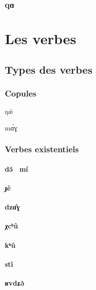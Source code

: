 \documentclass[11pt, a4paper]{book}              %
\newcommand{\ipa}[1]{{\phon \mbox{#1}}} %
\begin{document}
\section{\ipa{qɑ}}


\part{Les verbes}
\chapter{Types des verbes}
\section{Copules}

\ipa{ŋǽ} 

\ipa{mɑ́ɣ}

\section{Verbes existentiels}

\subsection{\ipa{də́} $~$ \ipa{mí}} 

\subsection{\ipa{ɟê}}

\subsection{\ipa{dzɑ̂ɣ}}

\subsection{\ipa{χcʰû}}

\subsection{\ipa{kʰû}}

\subsection{\ipa{stî}}

\subsection{\ipa{ʁvdʑə̂}}
\end{document}

